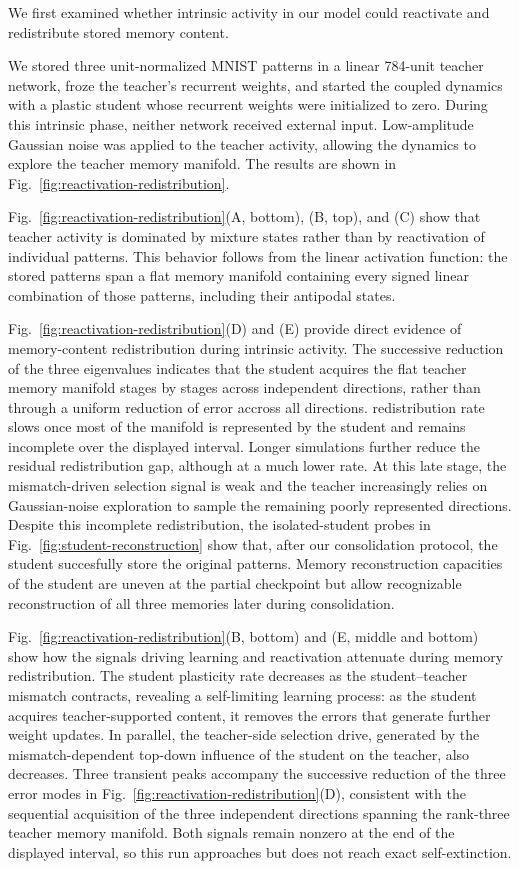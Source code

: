 \documentclass[10pt,letterpaper]{article}
\theoremstyle{plain}
\theoremstyle{remark}
\begin{document}
We first examined whether intrinsic activity in our model could reactivate and redistribute stored memory content.

We stored three unit-normalized MNIST patterns in a linear 784-unit teacher network, froze the teacher's recurrent weights, and started the coupled dynamics with a plastic student whose recurrent weights were initialized to zero. During this intrinsic phase, neither network received external input. Low-amplitude Gaussian noise was applied to the teacher activity, allowing the dynamics to explore the teacher memory manifold. The results are shown in Fig.~\ref{fig:reactivation-redistribution}.

Fig.~\ref{fig:reactivation-redistribution}(A, bottom), (B, top), and (C) show that teacher activity is dominated by mixture states rather than by reactivation of individual patterns. This behavior follows from the linear activation function: the stored patterns span a flat memory manifold containing every signed linear combination of those patterns, including their antipodal states. 

Fig.~\ref{fig:reactivation-redistribution}(D) and (E) provide direct evidence of memory-content redistribution during intrinsic activity. The successive reduction of the three eigenvalues indicates that the student acquires the flat teacher memory manifold stages by stages across independent directions, rather than through a uniform reduction of error accross all directions. redistribution rate slows once most of the manifold is represented by the student and remains incomplete over the displayed interval. Longer simulations further reduce the residual redistribution gap, although at a much lower rate. At this late stage, the mismatch-driven selection signal is weak and the teacher increasingly relies on Gaussian-noise exploration to sample the remaining poorly represented directions. Despite this incomplete redistribution, the isolated-student probes in Fig.~\ref{fig:student-reconstruction} show that, after our consolidation protocol, the student succesfully store the original patterns. Memory reconstruction capacities of the student are uneven at the partial checkpoint but allow recognizable reconstruction of all three memories later during consolidation.

Fig.~\ref{fig:reactivation-redistribution}(B, bottom) and (E, middle and bottom) show how the signals driving learning and reactivation attenuate during memory redistribution. The student plasticity rate decreases as the student--teacher mismatch contracts, revealing a self-limiting learning process: as the student acquires teacher-supported content, it removes the errors that generate further weight updates. In parallel, the teacher-side selection drive, generated by the mismatch-dependent top-down influence of the student on the teacher, also decreases. Three transient peaks accompany the successive reduction of the three error modes in Fig.~\ref{fig:reactivation-redistribution}(D), consistent with the sequential acquisition of the three independent directions spanning the rank-three teacher memory manifold. Both signals remain nonzero at the end of the displayed interval, so this run approaches but does not reach exact self-extinction.
\end{document}
